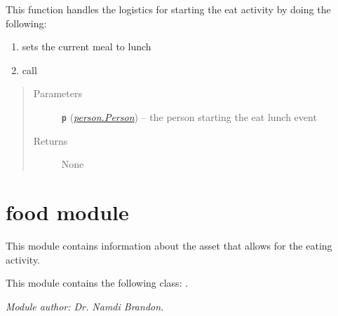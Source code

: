 \documentclass[letterpaper,10pt,english]{sphinxmanual}
\begin{document}
\begin{fulllineitems}
\begin{fulllineitems}
\begin{quote}
\begin{description}
\end{description}\end{quote}

\end{fulllineitems}


\begin{fulllineitems}
\label{eat:eat.Eat_Lunch.start_meal}
This function handles the logistics for starting the eat activity by doing the following:
\begin{enumerate}
\item {} 
sets the current meal to lunch

\item {} 
call 

\end{enumerate}
\begin{quote}\begin{description}
\item[{Parameters}] \leavevmode
\textbf{\texttt{p}} ({\hyperref[person:person.Person]{\emph{\emph{person.Person}}}}) -- the person starting the eat lunch event

\item[{Returns}] \leavevmode
None

\end{description}\end{quote}

\end{fulllineitems}


\end{fulllineitems}



\section{food module}
\label{food::doc}\label{food:module-food}\label{food:food-module}
This module contains information about the asset that allows for the eating activity.

This module contains the following class: {\hyperref[food:food.Food]{\emph{}}}.

\emph{Module author: Dr. Namdi Brandon.}
\end{document}
